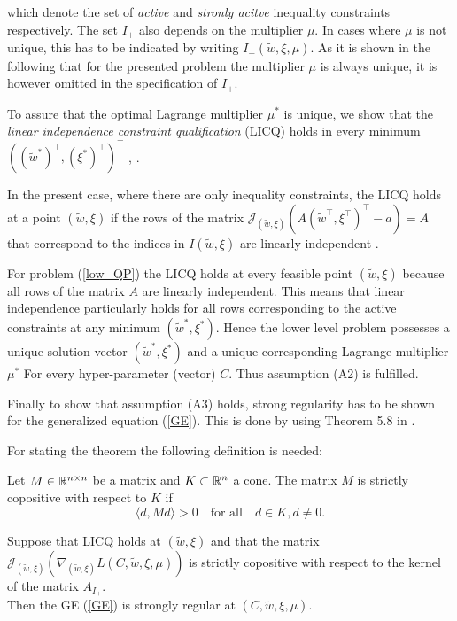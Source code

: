 which denote the set of \emph{active} and \emph{stronly acitve} inequality constraints respectively.
The set \(I_+\) also depends on the multiplier \(\mu\). In cases where \(\mu\) is not unique, this has to be indicated by writing \(I_+(\tilde{w},\xi,\mu)\).  As it is shown in the following that for the presented problem the multiplier \(\mu\) is always unique, it is however omitted in the specification of \(I_+\). 

To assure that the optimal Lagrange multiplier \(\mu^*\) is unique, we show that the \emph{linear independence constraint qualification} (LICQ) holds in every minimum  \(((\tilde{w}^*)^{\top},(\xi^*)^{\top})^{\top}\) \cite[Theorem 4.8, p. 82]{Outrata1998}, \cite[Theorem 1, p. 3]{Wachsmuth2013}.

In the present case, where there are only inequality constraints, the LICQ holds at a point \((\tilde{w},\xi)\) if the rows of the matrix \(\mathcal{J}_{(\tilde{w},\xi)}\left(A(\tilde{w}^{\top},\xi^{\top})^{\top} - a\right) = A\) that correspond to the indices in \(I(\tilde{w},\xi)\) are linearly independent \cite[p. 82, 96]{Outrata1998}.

For problem (\ref{low_QP}) the LICQ holds at every feasible point \((\tilde{w},\xi)\) because all rows of the matrix \(A\) are linearly independent. This means that linear independence particularly holds for all rows corresponding to the active constraints at any minimum \((\tilde{w}^*,\xi^*)\).
Hence the lower level problem possesses a unique solution vector \((\tilde{w}^*,\xi^*)\) and a unique corresponding Lagrange multiplier \(\mu^*\) For every hyper-parameter (vector) \(C\). Thus assumption (A2) is fulfilled.


Finally to show that assumption (A3) holds, strong regularity has to be shown for the generalized equation (\ref{GE}).
This is done by using Theorem 5.8 in \cite[p. 96]{Outrata1998}.

For stating the theorem the following definition is needed:
\begin{definition}
	Let \(M \in \mathbb{R}^{n\times n}\) be a matrix and \(K \subset \mathbb{R}^n\) a cone. The matrix \(M\) is strictly copositive with respect to \(K\) if 
	\[ \langle d,Md \rangle > 0 \quad \text{for all} \quad d \in K, d\neq 0. \]
\end{definition}

\begin{theorem}
	Suppose that LICQ holds at \((\tilde{w},\xi)\) and that the matrix \(\mathcal{J}_{(\tilde{w},\xi)}\left(\nabla_{(\tilde{w},\xi)}L(C,\tilde{w},\xi,\mu)\right)\) is strictly copositive with respect to the kernel of the matrix \(A_{I_+}\). \\
	Then the GE (\ref{GE}) is strongly regular at \((C,\tilde{w},\xi,\mu)\).
\end{theorem}

